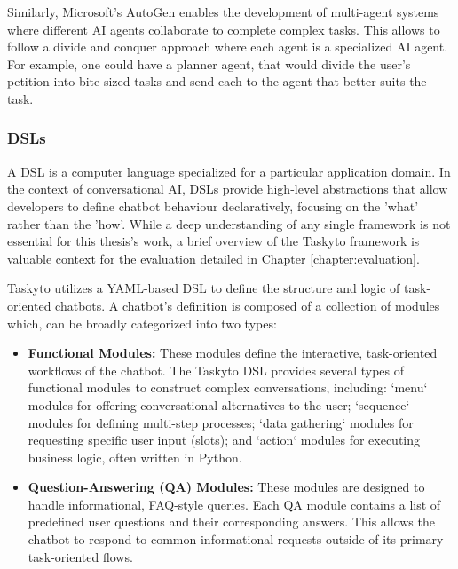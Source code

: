 Similarly, Microsoft's AutoGen \autocite{AutoGen}
enables the development of multi-agent systems
where different \ac{AI} agents collaborate to complete complex tasks.
This allows to follow a divide and conquer approach
where each agent is a specialized \ac{AI} agent.
For example, one could have a planner agent,
that would divide the user's petition into bite-sized tasks
and send each to the agent that better suits the task.

\subsubsection{\aclp{DSL}}

A \acl{DSL} is a computer language
specialized for a particular application domain.
In the context of conversational AI,
\acp{DSL} provide high-level abstractions
that allow developers to define chatbot behaviour declaratively,
focusing on the 'what' rather than the 'how'.
While a deep understanding of any single framework
is not essential for this thesis's work,
a brief overview of the Taskyto framework
\autocite{sanchezcuadradoAutomatingDevelopmentTaskoriented2024}
is valuable context for the evaluation
detailed in Chapter \ref{chapter:evaluation}.

Taskyto utilizes a YAML-based \ac{DSL}
to define the structure and logic of task-oriented chatbots.
A chatbot's definition is composed of a collection of modules which,
can be broadly categorized into two types:


\begin{itemize}
    \item \textbf{Functional Modules:}
      These modules define the interactive,
      task-oriented workflows of the chatbot.
      The Taskyto DSL provides several types of functional modules
      to construct complex conversations, including:
      `menu` modules for offering conversational alternatives to the user;
      `sequence` modules for defining multi-step processes;
      `data gathering` modules for requesting specific user input (slots);
      and `action` modules for executing business logic, often written in Python.

    \item \textbf{Question-Answering (QA) Modules:}
      These modules are designed to handle informational, FAQ-style queries.
      Each QA module contains
      a list of predefined user questions
      and their corresponding answers.
      This allows the chatbot to respond
      to common informational requests
      outside of its primary task-oriented flows.
\end{itemize}

